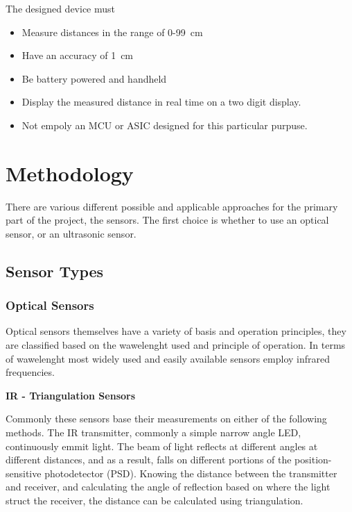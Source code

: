 \documentclass[12pt, a4paper]{article}
\begin{document}
            \noindent The designed device must
            \begin{itemize}
                \item Measure distances in the range of 0-99\SI{}{\centi\metre}
                \item Have an accuracy of \SI{1}{\centi\metre}
                \item Be battery powered and handheld
                \item Display the measured distance in real time on a two digit display.
                \item Not empoly an MCU or ASIC designed for this particular purpuse.
            \end{itemize}

        
    \pagebreak
    \section{Methodology}
        There are various different possible and applicable approaches for the primary part of the project, the sensors. The first choice is whether to use an optical sensor, or an ultrasonic sensor.

        \subsection{Sensor Types}

            \subsubsection{Optical Sensors}
                Optical sensors themselves have a variety of basis and operation principles, they are classified based on the wawelenght used and principle of operation. In terms of wawelenght most widely used and easily available sensors employ infrared frequencies. 


                \bigskip\noindent
                \textbf{IR - Triangulation Sensors}

                    Commonly these sensors base their measurements on either of the following methods. The IR transmitter, commonly a simple narrow angle LED, continuously emmit light. The beam of light reflects at different angles at different distances, and as a result, falls on different portions of the position-sensitive photodetector (PSD). Knowing the distance between the transmitter and receiver, and calculating the angle of reflection based on where the light struct the receiver, the distance can be calculated using triangulation.
\end{document}

